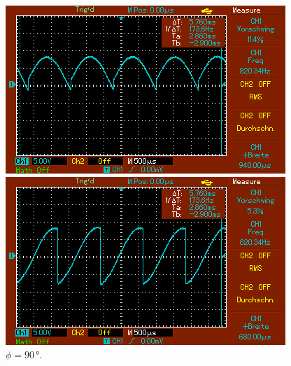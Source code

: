 \begin{figure}
    \begin{minipage}[b]{.45\linewidth} %
       \includegraphics[width=\linewidth]{bilder/MAP005.png}
       \caption{$\phi = 60\,\unit{°}$.}
    \end{minipage}
    \hspace{0.1\linewidth}%
    \begin{minipage}[b]{.45\linewidth} %
       \includegraphics[width=\linewidth]{bilder/MAP006.png}
       \caption{$\phi = 90\,\unit{°}$.}
    \end{minipage}
\end{figure}

